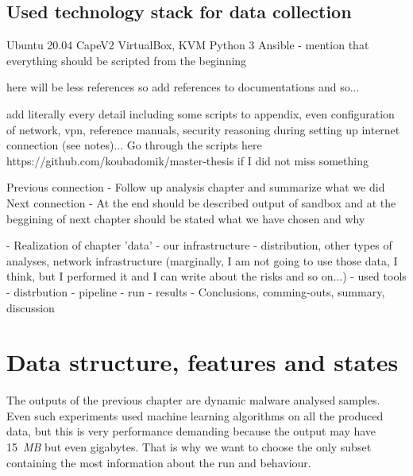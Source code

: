 \section{Used technology stack for data collection}
Ubuntu 20.04
CapeV2
VirtualBox, KVM
Python 3
Ansible - mention that everything should be scripted from the beginning






here will be less references so add references to documentations and so...

add literally every detail including some scripts to appendix, even configuration of network, vpn, reference manuals, security reasoning during setting up internet connection (see notes)...
Go through the scripts here https://github.com/koubadomik/master-thesis if I did not miss something


Previous connection
- Follow up analysis chapter and summarize what we did
Next connection
- At the end should be described output of sandbox and at the beggining of next chapter should be stated what we have chosen and why



- Realization of chapter 'data'
- our infrastructure - distribution, other types of analyses, network infrastructure (marginally, I am not going to use those data, I think, but I performed it and I can write about the risks and so on...)
- used tools
- distrbution
- pipeline
- run
- results
- Conclusions, comming-outs, summary, discussion








\chapter{Data structure, features and states} \label{chap:data}
The outputs of the previous chapter are dynamic malware analysed samples. Even such experiments used machine learning algorithms on all the produced data, but this is very performance demanding because the output may have 15~\emph{MB} but even gigabytes. That is why we want to choose the only subset containing the most information about the run and behaviour. 

